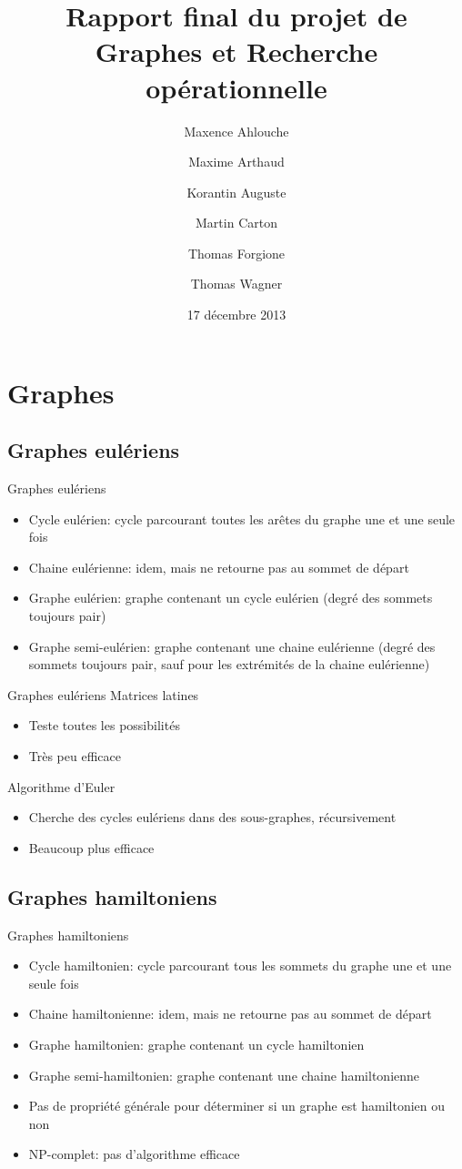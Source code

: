 \documentclass{beamer}
\title[Rapport final de GRO]
      {Rapport final du projet de\\Graphes et Recherche opérationnelle}
\institute{Enseeiht}
\author
  [Ahlouche \and Arthaud \and Auguste
    \and Carton \and Forgione \and Wagner]
  {Maxence Ahlouche \and Maxime Arthaud \and Korantin Auguste
    \and Martin Carton \and Thomas Forgione \and Thomas Wagner}
\date{17 décembre 2013}
\begin{document}
\begin{frame}
  \titlepage
\end{frame}

\section{Graphes}

\subsection{Graphes eulériens}
\begin{frame}{Graphes eulériens}
  \begin{itemize}
    \item Cycle eulérien: cycle parcourant toutes les arêtes du graphe une et une seule fois
    \item Chaine eulérienne: idem, mais ne retourne pas au sommet de départ
    \item Graphe eulérien: graphe contenant un cycle eulérien (degré des sommets toujours pair)
    \item Graphe semi-eulérien: graphe contenant une chaine eulérienne (degré des sommets toujours pair, sauf pour les extrémités de la chaine eulérienne)
  \end{itemize}
\end{frame}

\begin{frame}{Graphes eulériens}
  Matrices latines
  \begin{itemize}
  \item Teste toutes les possibilités
  \item Très peu efficace
  \end{itemize}
  Algorithme d'Euler
  \begin{itemize}
  \item Cherche des cycles eulériens dans des sous-graphes, récursivement
  \item Beaucoup plus efficace
  \end{itemize}
\end{frame}

\subsection{Graphes hamiltoniens}
\begin{frame}{Graphes hamiltoniens}
  \begin{itemize}
    \item Cycle hamiltonien: cycle parcourant tous les sommets du graphe une et une seule fois
    \item Chaine hamiltonienne: idem, mais ne retourne pas au sommet de départ
    \item Graphe hamiltonien: graphe contenant un cycle hamiltonien
    \item Graphe semi-hamiltonien: graphe contenant une chaine hamiltonienne 
    \item Pas de propriété générale pour déterminer si un graphe est hamiltonien ou non 
    \item NP-complet: pas d'algorithme efficace
  \end{itemize}
\end{frame}
\end{document}
